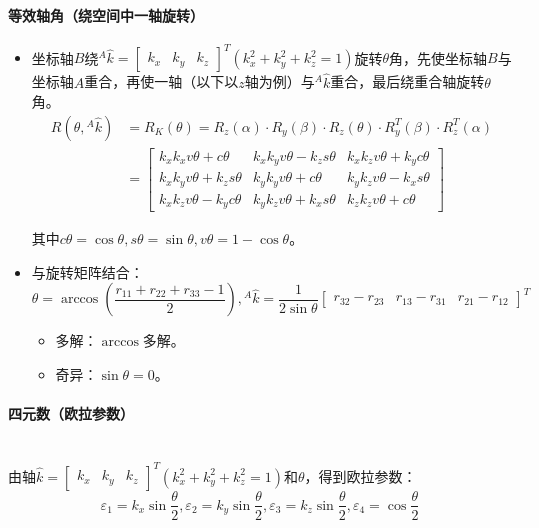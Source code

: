 \documentclass[
12pt, %
a4paper, 
oneside, %
headinclude,footinclude, %
]{scrartcl}
\begin{document}
\paragraph{等效轴角（绕空间中一轴旋转）}
\begin{itemize}
\item 坐标轴$ B $绕$ {}^A \hat{k} = \begin{bmatrix} k_x & k_y & k_z \end{bmatrix}^T (k_x^2 + k_y^2 + k_z^2 = 1) $旋转$ \theta $角，先使坐标轴$ B $与坐标轴$ A $重合，再使一轴（以下以$ z $轴为例）与$ ^A \hat{k} $重合，最后绕重合轴旋转$ \theta $角。
\begin{align*}
R(\theta, {}^A \hat{k}) &= R_K(\theta) = R_z(\alpha) \cdot R_y(\beta) \cdot R_z(\theta) \cdot R_y^T(\beta) \cdot R_z^T(\alpha) \\
&= \begin{bmatrix} k_x k_x v\theta + c\theta & k_x k_y v\theta - k_z s\theta & k_x k_z v\theta + k_y c\theta \\ k_x k_y v\theta + k_z s\theta & k_y k_y v\theta + c\theta & k_y k_z v\theta - k_x s\theta \\ k_x k_z v\theta - k_y c\theta & k_y k_z v\theta + k_x s\theta & k_z k_z v\theta + c\theta \end{bmatrix} 
\end{align*}

其中$ c\theta = \cos\theta, s\theta = \sin\theta, v\theta = 1 - \cos\theta $。
\item 与旋转矩阵结合：
$$ \theta = \arccos(\frac{r_{11} + r_{22} + r_{33} - 1}{2}), {}^A \hat{k} = \frac{1}{2 \sin\theta} \begin{bmatrix} r_{32} - r_{23} & r_{13} - r_{31} & r_{21} - r_{12} \end{bmatrix}^T $$
\begin{itemize}
\item 多解：$ \arccos $多解。    
\item 奇异：$ \sin\theta = 0 $。
\end{itemize}
\end{itemize}
\paragraph{四元数（欧拉参数）}~\\

由轴$ \hat{k} = \begin{bmatrix} k_x & k_y & k_z \end{bmatrix}^T (k_x^2 + k_y^2 + k_z^2 = 1) $和$ \theta $，得到欧拉参数：
$$ \varepsilon_1 = k_x \sin\frac{\theta}{2}, \varepsilon_2 = k_y \sin\frac{\theta}{2}, \varepsilon_3 = k_z \sin\frac{\theta}{2}, \varepsilon_4 = \cos\frac{\theta}{2} $$
\end{document}
